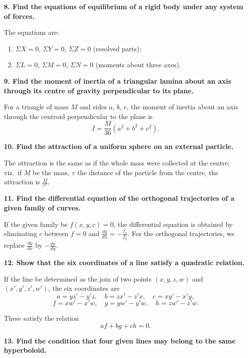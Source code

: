 \documentclass[11pt,a4paper]{article}
\theoremstyle{plain}
\theoremstyle{definition}
\theoremstyle{remark}
\begin{document}
\smallskip

\noindent\textbf{8. Find the equations of equilibrium of a rigid body under any system of forces.}

The equations are:
\begin{enumerate}[label=(\alph*)]
\item $\Sigma X = 0$, $\Sigma Y = 0$, $\Sigma Z = 0$ (resolved parts);
\item $\Sigma L = 0$, $\Sigma M = 0$, $\Sigma N = 0$ (moments about three axes).
\end{enumerate}

\smallskip

\noindent\textbf{9. Find the moment of inertia of a triangular lamina about an axis through its centre of gravity perpendicular to its plane.}

For a triangle of mass $M$ and sides $a$, $b$, $c$, the moment of inertia about an axis through the centroid perpendicular to the plane is
\[
I = \frac{M}{36}(a^2 + b^2 + c^2).
\]

\smallskip

\noindent\textbf{10. Find the attraction of a uniform sphere on an external particle.}

The attraction is the same as if the whole mass were collected at the centre; viz.\ if $M$ be the mass, $r$ the distance of the particle from the centre, the attraction is $\frac{M}{r^2}$.

\smallskip

\noindent\textbf{11. Find the differential equation of the orthogonal trajectories of a given family of curves.}

If the given family be $f(x, y, c) = 0$, the differential equation is obtained by eliminating $c$ between $f = 0$ and $\frac{dy}{dx} = -\frac{f_x}{f_y}$. For the orthogonal trajectories, we replace $\frac{dy}{dx}$ by $-\frac{dx}{dy}$.

\smallskip

\noindent\textbf{12. Show that the six coordinates of a line satisfy a quadratic relation.}

If the line be determined as the join of two points $(x, y, z, w)$ and $(x', y', z', w')$, the six coordinates are
\[
a = yz' - y'z,\quad b = zx' - z'x,\quad c = xy' - x'y,
\]
\[
f = xw' - x'w,\quad g = yw' - y'w,\quad h = zw' - z'w.
\]

These satisfy the relation
\[
af + bg + ch = 0.
\]

\smallskip

\noindent\textbf{13. Find the condition that four given lines may belong to the same hyperboloid.}
\end{document}
